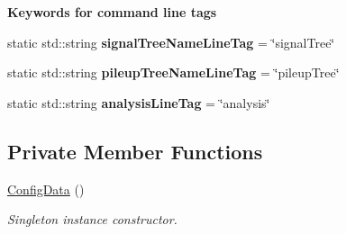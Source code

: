 \begin{Indent}{\bf Keywords for command line tags}
\begin{CompactItemize}
\item 
\hypertarget{classConfiguration_1_1ConfigData_ce4b5c8b1d19bfa5bcc83bb9632de0d0}{
static std::string \textbf{signal\-Tree\-Name\-Line\-Tag} = \char`\"{}signal\-Tree\char`\"{}}
\label{classConfiguration_1_1ConfigData_ce4b5c8b1d19bfa5bcc83bb9632de0d0}

\item 
\hypertarget{classConfiguration_1_1ConfigData_01fd9cc5e04573e667a302d092ec0d9c}{
static std::string \textbf{pileup\-Tree\-Name\-Line\-Tag} = \char`\"{}pileup\-Tree\char`\"{}}
\label{classConfiguration_1_1ConfigData_01fd9cc5e04573e667a302d092ec0d9c}

\item 
\hypertarget{classConfiguration_1_1ConfigData_72fb8dc529382bdc2b5530083f99b8f0}{
static std::string \textbf{analysis\-Line\-Tag} = \char`\"{}analysis\char`\"{}}
\label{classConfiguration_1_1ConfigData_72fb8dc529382bdc2b5530083f99b8f0}

\end{CompactItemize}
\end{Indent}
\subsection*{Private Member Functions}
\begin{CompactItemize}
\item 
\hypertarget{classConfiguration_1_1ConfigData_906d1b1a75f5bbe05ba4bf099b5548c2}{
\hyperlink{classConfiguration_1_1ConfigData_906d1b1a75f5bbe05ba4bf099b5548c2}{Config\-Data} ()}
\label{classConfiguration_1_1ConfigData_906d1b1a75f5bbe05ba4bf099b5548c2}

\begin{CompactList}\small\item\em Singleton instance constructor. \item\end{CompactList}\end{CompactItemize}
